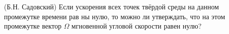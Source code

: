 (Б.Н. Садовский)
Если ускорения всех точек твёрдой среды на данном промежутке времени рав
ны нулю, то можно ли утверждать, что на этом промежутке вектор $\Omega$
мгновенной угловой скорости равен нулю?






